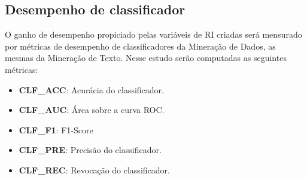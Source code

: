     \subsection{Desempenho de classificador}  \label{sec:Desempenho-de-classificador}
    O ganho de desempenho propiciado pelas variáveis de RI criadas será mensurado por métricas de desempenho de classificadores da Mineração de Dados, as mesmas da Mineração de Texto.
    Nesse estudo serão computadas as seguintes métricas:
    \begin{itemize}
        \item \textbf{CLF\_ACC}: Acurácia do classificador.
        \item \textbf{CLF\_AUC}: Área sobre a curva ROC.
        \item \textbf{CLF\_F1}: F1-Score
        \item \textbf{CLF\_PRE}: Precisão do classificador.
        \item \textbf{CLF\_REC}: Revocação do classificador.
    \end{itemize}








% 
